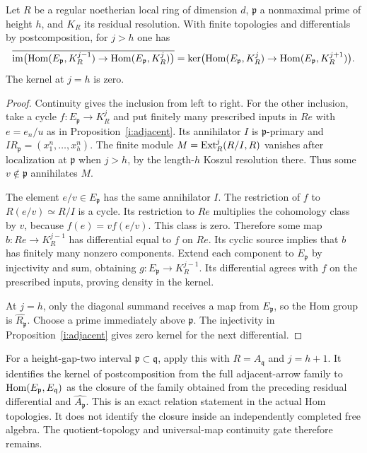 \begin{proposition}\label{i:closedexact}
Let $R$ be a regular noetherian local ring of dimension $d$,
$\mathfrak p$ a nonmaximal prime of height $h$, and $K_R$ its
residual resolution. With finite topologies and differentials by
postcomposition, for $j>h$ one has
\[
 \overline{\operatorname{im}\bigl(
  \operatorname{Hom}(E_{\mathfrak p},K_R^{j-1})\to
  \operatorname{Hom}(E_{\mathfrak p},K_R^j)\bigr)}
 =\ker\bigl(\operatorname{Hom}(E_{\mathfrak p},K_R^j)\to
             \operatorname{Hom}(E_{\mathfrak p},K_R^{j+1})\bigr).
\]
The kernel at $j=h$ is zero.
\end{proposition}
\begin{proof}
Continuity gives the inclusion from left to right. For the other
inclusion, take a cycle $f:E_{\mathfrak p}\to K_R^j$ and put
finitely many prescribed inputs in $Re$ with $e=e_n/u$ as in
Proposition~\ref{i:adjacent}. Its annihilator $I$ is
$\mathfrak p$-primary and
$I R_{\mathfrak p}=(x_1^n,\ldots,x_h^n)$.
The finite module $M=\operatorname{Ext}_R^j(R/I,R)$ vanishes after localization
at $\mathfrak p$ when $j>h$, by the length-$h$ Koszul resolution
there. Thus some $v\notin\mathfrak p$ annihilates $M$.

The element $e/v\in E_{\mathfrak p}$ has the same annihilator
$I$. The restriction of $f$ to $R(e/v)\simeq R/I$ is a cycle.
Its restriction to $Re$ multiplies the cohomology class by $v$,
because $f(e)=v f(e/v)$. This class is zero. Therefore some map
$b:Re\to K_R^{j-1}$ has differential equal to $f$ on $Re$.
Its cyclic source implies that $b$ has finitely many nonzero
components. Extend each component to $E_{\mathfrak p}$ by
injectivity and sum, obtaining
$g:E_{\mathfrak p}\to K_R^{j-1}$. Its differential agrees with
$f$ on the prescribed inputs, proving density in the kernel.

At $j=h$, only the diagonal summand receives a map from
$E_{\mathfrak p}$, so the Hom group is $\widehat{R_{\mathfrak p}}$.
Choose a prime immediately above $\mathfrak p$. The injectivity
in Proposition~\ref{i:adjacent} gives zero kernel for the next
differential.
\end{proof}

For a height-gap-two interval $\mathfrak p\subset\mathfrak q$,
apply this with $R=A_{\mathfrak q}$ and $j=h+1$. It identifies
the kernel of postcomposition from the full adjacent-arrow family
to $\operatorname{Hom}(E_{\mathfrak p},E_{\mathfrak q})$ as the closure of
the family obtained from the preceding residual differential and
$\widehat{A_{\mathfrak p}}$. This is an exact relation statement
in the actual Hom topologies. It does not identify the closure
inside an independently completed free algebra. The quotient-topology
and universal-map continuity gate therefore remains.

